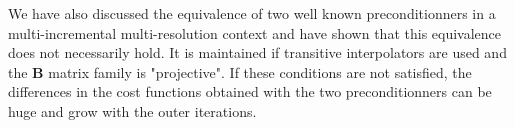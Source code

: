\documentclass[npg, manuscript]{copernicus}
\begin{document}
We have also discussed the equivalence of two well known preconditionners in a multi-incremental multi-resolution context and have shown that this equivalence does not necessarily hold. It is maintained if transitive interpolators are used and the $\mathbf{B}$ matrix family is "projective". If these conditions are not satisfied, the differences in the cost functions obtained with the two preconditionners can be huge and grow with the outer iterations. 












\appendix



\noappendix       %




\appendixfigures  %
\end{document}
